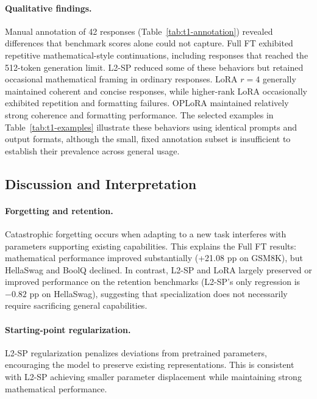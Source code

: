 \documentclass{article}
\begin{document}
\paragraph{Qualitative findings.}
Manual annotation of 42 responses (Table~\ref{tab:t1-annotation}) revealed differences that benchmark scores alone could not capture. Full FT exhibited repetitive mathematical-style continuations, including responses that reached the 512-token generation limit. L2-SP reduced some of these behaviors but retained occasional mathematical framing in ordinary responses. LoRA $r{=}4$ generally maintained coherent and concise responses, while higher-rank LoRA occasionally exhibited repetition and formatting failures. OPLoRA maintained relatively strong coherence and formatting performance. The selected examples in Table~\ref{tab:t1-examples} illustrate these behaviors using identical prompts and output formats, although the small, fixed annotation subset is insufficient to establish their prevalence across general usage.



\subsection{Discussion and Interpretation}
\label{sec:finetuning-discussion}

\paragraph{Forgetting and retention.}
Catastrophic forgetting \citep{kirkpatrick2017overcoming} occurs when adapting to a new task interferes with parameters supporting existing capabilities. This explains the Full FT results: mathematical performance improved substantially (+21.08 pp on GSM8K), but HellaSwag and BoolQ declined. In contrast, L2-SP and LoRA largely preserved or improved performance on the retention benchmarks (L2-SP's only regression is $-0.82$ pp on HellaSwag), suggesting that specialization does not necessarily require sacrificing general capabilities.

\paragraph{Starting-point regularization.}
L2-SP regularization \citep{li2018l2sp} penalizes deviations from pretrained parameters, encouraging the model to preserve existing representations. This is consistent with L2-SP achieving smaller parameter displacement while maintaining strong mathematical performance.
\end{document}
